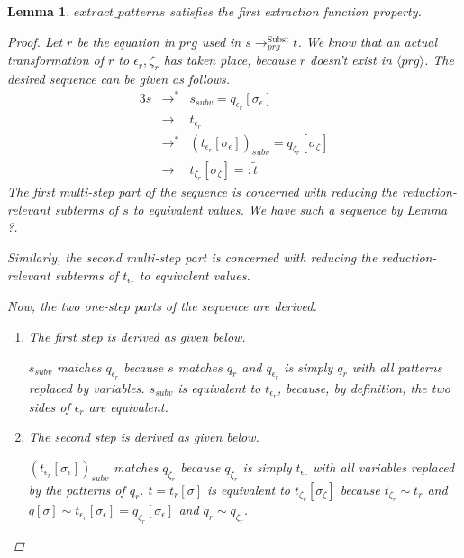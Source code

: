 \documentclass[11pt]{article} %
\newtheorem*{lemma*}{Lemma}
\begin{document}
\begin{lemma*}

$extract\_patterns$ satisfies the first extraction function property.

\begin{proof}

Let $r$ be the equation in $prg$ used in $s \longrightarrow^{\textrm{Subst}}_{prg} t$. We know that an actual transformation of $r$ to $\epsilon_r, \zeta_r$ has taken place, because $r$ doesn't exist in $\langle prg \rangle$. The desired sequence can be given as follows.
\begin{alignat*}{3}
s &\longrightarrow^* &s_{subv} = q_{\epsilon_r}[\sigma_\epsilon]\\
&\longrightarrow &t_{\epsilon_r}\\
&\longrightarrow^*  &(t_{\epsilon_r}[\sigma_\epsilon])_{subv} = q_{\zeta_r}[\sigma_\zeta]\\
&\longrightarrow &t_{\zeta_r}[\sigma_\zeta] =: \widetilde{t}
\end{alignat*}
The first multi-step part of the sequence is concerned with reducing the reduction-relevant subterms of $s$ to equivalent values. We have such a sequence by Lemma ?.

Similarly, the second multi-step part is concerned with reducing the reduction-relevant subterms of $t_{\epsilon_r}$ to equivalent values.

Now, the two one-step parts of the sequence are derived.

\begin{enumerate}
\item The first step is derived as given below.
\begin{prooftree}
\end{prooftree}
$s_{subv}$ matches $q_{\epsilon_r}$ because $s$ matches $q_r$ and $q_{\epsilon_r}$ is simply $q_r$ with all patterns replaced by variables. $s_{subv}$ is equivalent to $t_{\epsilon_r}$, because, by definition, the two sides of $\epsilon_r$ are equivalent.

\item The second step is derived as given below.
\begin{prooftree}
\end{prooftree}
$(t_{\epsilon_r}[\sigma_\epsilon])_{subv}$ matches $q_{\zeta_r}$ because $q_{\zeta_r}$ is simply $t_{\epsilon_r}$ with all variables replaced by the patterns of $q_r$. $t = t_r[\sigma]$ is equivalent to $t_{\zeta_r}[\sigma_\zeta]$ because $t_{\zeta_r} \sim t_r$ and $q[\sigma] \sim t_{\epsilon_r}[\sigma_\epsilon] = q_{\zeta_r}[\sigma_\epsilon]$ and $q_r \sim q_{\zeta_r}$.


\end{enumerate}
\end{proof}
\end{lemma*}
\end{document}
